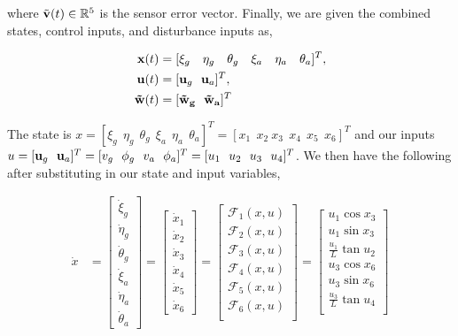 \documentclass[paper=a4, fontsize=11pt]{scrartcl} %
\numberwithin{equation}{section} %
\numberwithin{figure}{section} %
\numberwithin{table}{section} %
\begin{document}
\begin{framed}
where $\Tilde{\bold{v}}(t) \in \mathbb{R}^5$ is the sensor error vector.  Finally, we are given the combined states, control inputs, and disturbance inputs as,

\begin{align*}
    \bold{x}(t) &= [ \xi_g \ \ \ \eta_g \ \ \ \theta_g \ \ \ \xi_a \ \ \ \eta_a \ \ \ \theta_a ] ^T ,\\
    \bold{u}(t) &= [ \bold{u}_g \ \ \bold{u}_a ]^T ,\\
    \bold{\Tilde{w}}(t) &= [\bold{\Tilde{w}_g \ \ \bold{\Tilde{w}}_a}]^T \\
\end{align*}

The state is $x = [\xi_g \ \  \eta_g \ \  \theta_g \ \  \xi_a \ \  \eta_a \ \ \theta_a ]^T = [ x_1 \ \ x_2 \  x_3 \ \ x_4 \ \ x_5 \ \ x_6 ]^T$ and our inputs $u = [ \bold{u}_g \ \ \bold{u}_a ]^T = [v_g \ \ \phi_g \ \ v_a \ \ \phi_a]^T = [u_1 \ \ u_2 \ \ u_3 \ \ u_4 ]^T$.  We then have the following after substituting in our state and input variables,

\begin{align*}
    \dot{x} &= \begin{bmatrix}
           \dot{\xi}_g \\
           \dot{\eta}_g \\
           \dot{\theta}_g \\
           \dot{\xi}_a \\
           \dot{\eta}_a \\
           \dot{\theta}_a
         \end{bmatrix} 
         =  \begin{bmatrix}
           \dot{x}_1 \\
           \dot{x}_2 \\
           \dot{x}_3 \\
           \dot{x}_4 \\
           \dot{x}_5 \\
           \dot{x}_6
         \end{bmatrix} 
         = \begin{bmatrix}
           \mathcal{F}_1(x,u) \\
           \mathcal{F}_2(x,u) \\
           \mathcal{F}_3(x,u) \\
           \mathcal{F}_4(x,u) \\
           \mathcal{F}_5(x,u) \\
           \mathcal{F}_6(x,u) \\
         \end{bmatrix}
         = \begin{bmatrix}
           u_1 \cos{x_3} \\
           u_1 \sin{x_3} \\
           \frac{u_1}{L} \tan{u_2} \\
           u_3 \cos{x_6} \\
           u_3 \sin{x_6} \\
           \frac{u_3}{L} \tan{u_4} \\
         \end{bmatrix} 
\end{align*}



\end{framed}
\end{document}
